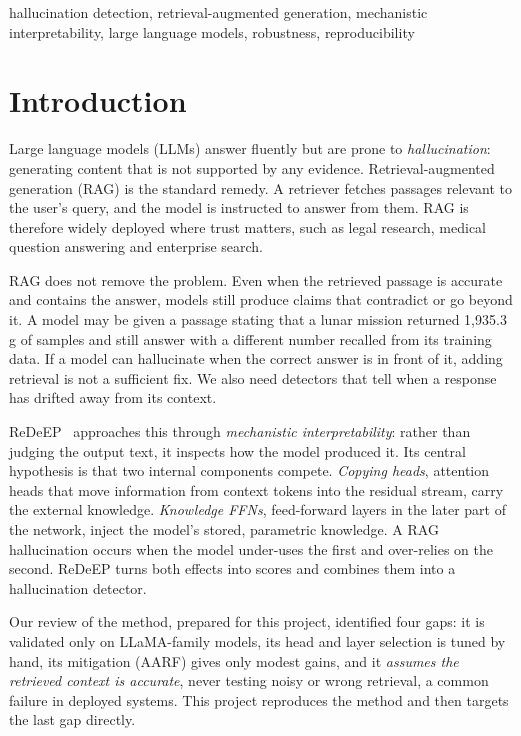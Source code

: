 \documentclass[conference]{IEEEtran}
\begin{document}
\begin{IEEEkeywords}
hallucination detection, retrieval-augmented generation, mechanistic interpretability, large language models, robustness, reproducibility
\end{IEEEkeywords}

\section{Introduction}
Large language models (LLMs) answer fluently but are prone to \emph{hallucination}: generating content that is not supported by any evidence. Retrieval-augmented generation (RAG) is the standard remedy. A retriever fetches passages relevant to the user's query, and the model is instructed to answer from them. RAG is therefore widely deployed where trust matters, such as legal research, medical question answering and enterprise search.

RAG does not remove the problem. Even when the retrieved passage is accurate and contains the answer, models still produce claims that contradict or go beyond it. A model may be given a passage stating that a lunar mission returned 1,935.3\,g of samples and still answer with a different number recalled from its training data. If a model can hallucinate when the correct answer is in front of it, adding retrieval is not a sufficient fix. We also need detectors that tell when a response has drifted away from its context.

ReDeEP~\cite{sun2025redeep} approaches this through \emph{mechanistic interpretability}: rather than judging the output text, it inspects how the model produced it. Its central hypothesis is that two internal components compete. \emph{Copying heads}, attention heads that move information from context tokens into the residual stream, carry the external knowledge. \emph{Knowledge FFNs}, feed-forward layers in the later part of the network, inject the model's stored, parametric knowledge. A RAG hallucination occurs when the model under-uses the first and over-relies on the second. ReDeEP turns both effects into scores and combines them into a hallucination detector.

Our review of the method, prepared for this project, identified four gaps: it is validated only on LLaMA-family models, its head and layer selection is tuned by hand, its mitigation (AARF) gives only modest gains, and it \emph{assumes the retrieved context is accurate}, never testing noisy or wrong retrieval, a common failure in deployed systems. This project reproduces the method and then targets the last gap directly.
\end{document}
